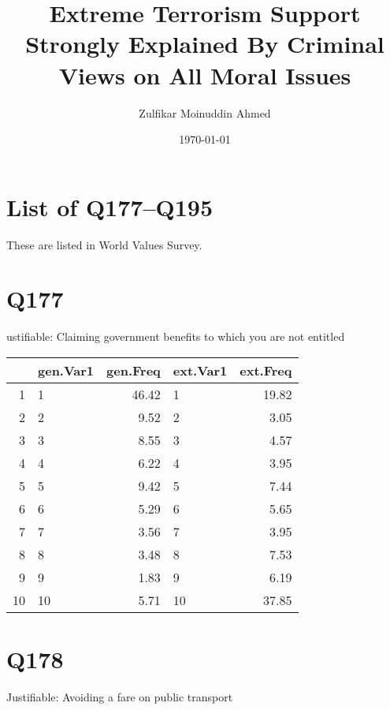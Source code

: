 \documentclass{amsart}
\title{Extreme Terrorism Support Strongly Explained By Criminal Views on All Moral Issues}
\author{Zulfikar Moinuddin Ahmed}
\date{\today}
\begin{document}
\maketitle

\section{List of Q177--Q195}

These are listed in World Values Survey.

\section{Q177}

ustifiable: Claiming government benefits to which you are not entitled

\begin{table}[ht]
\centering
\begin{tabular}{rlrlr}
  \hline
 & gen.Var1 & gen.Freq & ext.Var1 & ext.Freq \\ 
  \hline
1 & 1 & 46.42 & 1 & 19.82 \\ 
  2 & 2 & 9.52 & 2 & 3.05 \\ 
  3 & 3 & 8.55 & 3 & 4.57 \\ 
  4 & 4 & 6.22 & 4 & 3.95 \\ 
  5 & 5 & 9.42 & 5 & 7.44 \\ 
  6 & 6 & 5.29 & 6 & 5.65 \\ 
  7 & 7 & 3.56 & 7 & 3.95 \\ 
  8 & 8 & 3.48 & 8 & 7.53 \\ 
  9 & 9 & 1.83 & 9 & 6.19 \\ 
  10 & 10 & 5.71 & 10 & 37.85 \\ 
   \hline
\end{tabular}
\end{table}

\section{Q178}
Justifiable: Avoiding a fare on public transport
\end{document}
